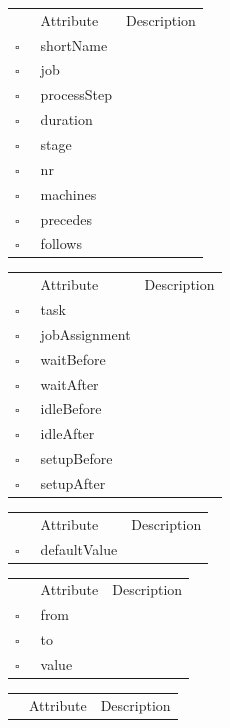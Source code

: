 \begin{table}
\caption{Task  }

\begin{longtable}{llp{8cm}}
& Attribute & Description \\
$\square$\ & shortName &  \\
$\square$\ & job &  \\
$\square$\ & processStep &  \\
$\square$\ & duration &  \\
$\square$\ & stage &  \\
$\square$\ & nr &  \\
$\square$\ & machines &  \\
$\square$\ & precedes &  \\
$\square$\ & follows &  \\
\end{longtable}
\label{attr:Task}
\end{table}

\clearpage
\begin{table}
\caption{TaskAssignment  }

\begin{longtable}{llp{8cm}}
& Attribute & Description \\
$\square$\ & task &  \\
$\square$\ & jobAssignment &  \\
$\square$\ & waitBefore &  \\
$\square$\ & waitAfter &  \\
$\square$\ & idleBefore &  \\
$\square$\ & idleAfter &  \\
$\square$\ & setupBefore &  \\
$\square$\ & setupAfter &  \\
\end{longtable}
\label{attr:TaskAssignment}
\end{table}

\begin{table}
\caption{Transport  }

\begin{longtable}{llp{8cm}}
& Attribute & Description \\
$\square$\ & defaultValue &  \\
\end{longtable}
\label{attr:Transport}
\end{table}

\begin{table}
\caption{TransportMatrix  }

\begin{longtable}{llp{8cm}}
& Attribute & Description \\
$\square$\ & from &  \\
$\square$\ & to &  \\
$\square$\ & value &  \\
\end{longtable}
\label{attr:TransportMatrix}
\end{table}

\begin{table}
\caption{WiP  }

\begin{longtable}{llp{8cm}}
& Attribute & Description \\
\end{longtable}
\label{attr:WiP}
\end{table}
